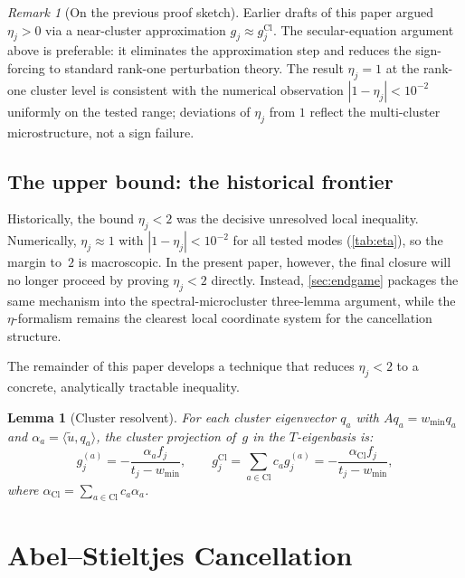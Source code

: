 \documentclass[12pt,a4paper]{article}
\newtheorem{lemma}[theorem]{Lemma}
\theoremstyle{definition}
\theoremstyle{remark}
\newtheorem{remark}[theorem]{Remark}
\newcommand{\Cl}{\mathrm{Cl}}
\newcommand{\ip}[2]{\langle #1, #2 \rangle}
\newcommand{\utilde}{\tilde{u}}
\newcommand{\wmin}{w_{\min}}
\begin{document}
\begin{remark}[On the previous proof sketch]
\label{rem:eta-positive-history}
Earlier drafts of this paper argued $\eta_j > 0$ via a near-cluster
approximation $g_j \approx g_j^{\Cl}$.  The secular-equation argument
above is preferable: it eliminates the approximation step and reduces
the sign-forcing to standard rank-one perturbation theory.  The result
$\eta_j = 1$ at the rank-one cluster level is consistent with the
numerical observation $|1 - \eta_j| < 10^{-2}$ uniformly on the tested
range; deviations of $\eta_j$ from $1$ reflect the multi-cluster
microstructure, not a sign failure.
\end{remark}

\subsection{The upper bound: the historical frontier}

Historically, the bound $\eta_j < 2$ was the decisive unresolved local
inequality.  Numerically, $\eta_j \approx 1$ with $|1-\eta_j|<10^{-2}$
for all tested modes (\cref{tab:eta}), so the margin to~$2$ is
macroscopic.  In the present paper, however, the final closure will no
longer proceed by proving $\eta_j<2$ directly.  Instead, \cref{sec:endgame}
packages the same mechanism into the spectral-microcluster three-lemma
argument, while the $\eta$-formalism remains the clearest local
coordinate system for the cancellation structure.

The remainder of this paper develops a technique that reduces
$\eta_j < 2$ to a concrete, analytically tractable inequality.

\begin{lemma}[Cluster resolvent]
\label{lem:cluster-resolvent}
For each cluster eigenvector $q_a$ with $A q_a = \wmin q_a$
and $\alpha_a = \ip{\utilde}{q_a}$, the cluster projection of~$g$
in the $T$-eigenbasis is:
\begin{equation}
g_j^{(a)} = -\frac{\alpha_a f_j}{t_j - \wmin},
\qquad
g_j^{\Cl} = \sum_{a \in \Cl} c_a g_j^{(a)}
= -\frac{\alpha_{\Cl} f_j}{t_j - \wmin},
\end{equation}
where $\alpha_{\Cl} = \sum_{a \in \Cl} c_a \alpha_a$.
\end{lemma}

\section{Abel--Stieltjes Cancellation}
\label{sec:abel}
\end{document}
